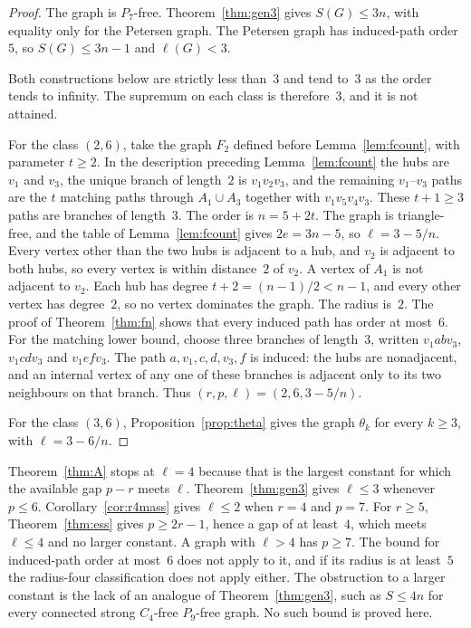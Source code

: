 \documentclass[ASNA]{USG}
\theoremstyle{WBstyletwo}
\numberwithin{equation}{section}
\newcommand{\lr}{\ell}
\newcommand{\pp}{p}
\begin{document}
\begin{proof}
The graph is $P_7$-free. Theorem~\ref{thm:gen3} gives $S(G)\le 3n$, with equality only for the Petersen graph. The Petersen graph has induced-path order~$5$, so $S(G)\le 3n-1$ and $\lr(G)<3$.

Both constructions below are strictly less than~$3$ and tend to~$3$ as the order tends to infinity. The supremum on each class is therefore~$3$, and it is not attained.

For the class $(2,6)$, take the graph $F_2$ defined before Lemma~\ref{lem:fcount}, with parameter $t\ge 2$. In the description preceding Lemma~\ref{lem:fcount} the hubs are $v_1$ and $v_3$, the unique branch of length~$2$ is $v_1v_2v_3$, and the remaining $v_1$--$v_3$ paths are the $t$ matching paths through $A_1\cup A_3$ together with $v_1v_5v_4v_3$. These $t+1\ge 3$ paths are branches of length~$3$. The order is $n=5+2t$. The graph is triangle-free, and the table of Lemma~\ref{lem:fcount} gives $2e=3n-5$, so $\lr=3-5/n$. Every vertex other than the two hubs is adjacent to a hub, and $v_2$ is adjacent to both hubs, so every vertex is within distance~$2$ of $v_2$. A vertex of $A_1$ is not adjacent to $v_2$. Each hub has degree $t+2=(n-1)/2<n-1$, and every other vertex has degree~$2$, so no vertex dominates the graph. The radius is~$2$. The proof of Theorem~\ref{thm:fn} shows that every induced path has order at most~$6$. For the matching lower bound, choose three branches of length~$3$, written $v_1abv_3$, $v_1cdv_3$ and $v_1efv_3$. The path $a,v_1,c,d,v_3,f$ is induced: the hubs are nonadjacent, and an internal vertex of any one of these branches is adjacent only to its two neighbours on that branch. Thus $(r,\pp,\lr)=(2,6,3-5/n)$.

For the class $(3,6)$, Proposition~\ref{prop:theta} gives the graph $\theta_k$ for every $k\ge 3$, with $\lr=3-6/n$.
\end{proof}

Theorem~\ref{thm:A} stops at $\lr=4$ because that is the largest constant for which the available gap $\pp-r$ meets $\lr$. Theorem~\ref{thm:gen3} gives $\lr\le 3$ whenever $\pp\le 6$. Corollary~\ref{cor:r4mass} gives $\lr\le 2$ when $r=4$ and $\pp=7$. For $r\ge 5$, Theorem~\ref{thm:ess} gives $\pp\ge 2r-1$, hence a gap of at least~$4$, which meets $\lr\le 4$ and no larger constant. A graph with $\lr>4$ has $\pp\ge 7$. The bound for induced-path order at most~$6$ does not apply to it, and if its radius is at least~$5$ the radius-four classification does not apply either. The obstruction to a larger constant is the lack of an analogue of Theorem~\ref{thm:gen3}, such as $S\le 4n$ for every connected strong $C_4$-free $P_9$-free graph. No such bound is proved here.
\end{document}
